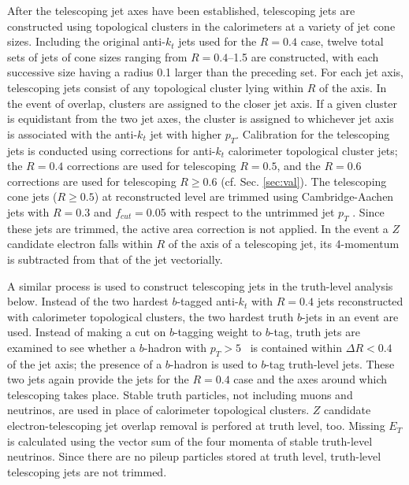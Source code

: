 After the telescoping jet axes have been established, telescoping jets are constructed using topological clusters in the calorimeters at a variety of jet cone sizes.  Including the original anti-$k_t$ jets used for the $R=0.4$ case, twelve total sets of jets of cone sizes ranging from $R=0.4$--1.5 are constructed, with each successive size having a radius 0.1 larger than the preceding set.  For each jet axis, telescoping jets consist of any topological cluster lying within $R$ of the axis.  In the event of overlap, clusters are assigned to the closer jet axis.  If a given cluster is equidistant from the two jet axes, the cluster is assigned to whichever jet axis is associated with the anti-$k_t$ jet with higher $p_T$.  Calibration for the telescoping jets is conducted using corrections for anti-$k_t$ calorimeter topological cluster jets; the $R=0.4$ corrections are used for telescoping $R=0.5$, and the $R=0.6$ corrections are used for telescoping $R\ge0.6$ (cf. Sec. \ref{sec:val}).  The telescoping cone jets ($R\ge0.5$) at reconstructed level are trimmed using Cambridge-Aachen jets with $R=0.3$ and $f_{cut}=0.05$ with respect to the untrimmed jet $p_T$ \cite{trimjet}.  Since these jets are trimmed, the active area correction is not applied.  In the event a $Z$ candidate electron falls within $R$ of the axis of a telescoping jet, its 4-momentum is subtracted from that of the jet vectorially.

A similar process is used to construct telescoping jets in the truth-level analysis below. Instead of the two hardest $b$-tagged anti-$k_t$ with $R=0.4$ jets reconstructed with calorimeter topological clusters, the two hardest truth $b$-jets in an event are used.  Instead of making a cut on $b$-tagging weight to $b$-tag, truth jets are examined to see whether a $b$-hadron with $p_T>5$ \GeV\ is contained within $\Delta R<0.4$ of the jet axis; the presence of a $b$-hadron is used to $b$-tag truth-level jets.  These two jets again provide the jets for the $R=0.4$ case and the axes around which telescoping takes place.  Stable truth particles, not including muons and neutrinos, are used in place of calorimeter topological clusters.  $Z$ candidate electron-telescoping jet overlap removal is perfored at truth level, too.  Missing $E_T$ is calculated using the vector sum of the four momenta of stable truth-level neutrinos.  Since there are no pileup particles stored at truth level, truth-level telescoping jets are not trimmed.


